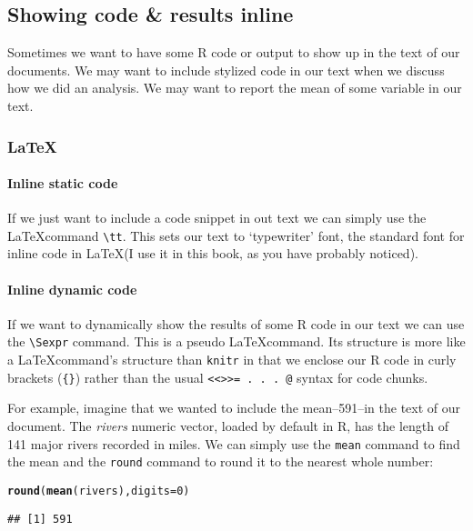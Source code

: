 \documentclass[ChapterTOCs,krantz1]{krantz}\usepackage{graphicx, color}
\makeatletter
\newcommand{\hlfunctioncall}[1]{\textcolor[rgb]{0.501960784313725,0,0.329411764705882}{\textbf{#1}}}%
\newenvironment{kframe}{%
 \def\at@end@of@kframe{}%
 \ifinner\ifhmode%
  \def\at@end@of@kframe{\end{minipage}}%
  \begin{minipage}{\columnwidth}%
 \fi\fi%
 \def\FrameCommand##1{\hskip\@totalleftmargin \hskip-\fboxsep
 \colorbox{shadecolor}{##1}\hskip-\fboxsep
     \hskip-\linewidth \hskip-\@totalleftmargin \hskip\columnwidth}%
 \MakeFramed {\advance\hsize-\width
   \@totalleftmargin\z@ \linewidth\hsize
   \@setminipage}}%
 {\par\unskip\endMakeFramed%
 \at@end@of@kframe}
\newenvironment{knitrout}{}{} %
\makeatother
\begin{document}
\subsection{Showing code \& results inline}

Sometimes we want to have some R code or output to show up in the text of our documents. We may want to include stylized code in our text when we discuss how we did an analysis. We may want to report the mean of some variable in our text.

\subsubsection{LaTeX}

\paragraph{Inline static code}

If we just want to include a code snippet in out text we can simply use the \LaTeX command  \texttt{\textbackslash{}tt}. This sets our text to `typewriter' font, the standard font for inline code in \LaTeX (I use it in this book, as you have probably noticed).

\paragraph{Inline dynamic code}

If we want to dynamically show the results of some R code in our text we can use the  \texttt{\textbackslash Sexpr} command. This is a pseudo \LaTeX command. Its structure is more like a \LaTeX command's structure than \texttt{knitr} in that we enclose our R code in curly brackets (\texttt{\{\}}) rather than the usual \texttt{\textless\textless\textgreater\textgreater= . . . @} syntax for code chunks.

For example, imagine that we wanted to include the mean--591--in the text of our document. The {\emph{rivers}} numeric vector, loaded by default in R, has the length of 141 major rivers recorded in miles. We can simply use the {\tt{mean}} command to find the mean and the {\tt{round}} command to round it to the nearest whole number:

\begin{knitrout}
\color{fgcolor}\begin{kframe}
\begin{alltt}
\hlfunctioncall{round}(\hlfunctioncall{mean}(rivers), digits = 0)
\end{alltt}
\begin{verbatim}
## [1] 591
\end{verbatim}
\end{kframe}
\end{knitrout}
\end{document}
